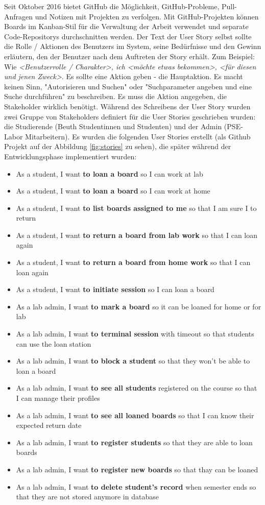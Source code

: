 Seit Oktober 2016 bietet GitHub die Möglichkeit, GitHub-Probleme, Pull-Anfragen und Notizen mit Projekten zu verfolgen. Mit GitHub-Projekten können Boards im Kanban-Stil für die Verwaltung der Arbeit verwendet und separate Code-Repositorys durchschnitten werden. Der Text der User Story selbst sollte die Rolle / Aktionen des Benutzers im System, seine Bedürfnisse und den Gewinn erläutern, den der Benutzer nach dem Auftreten der Story erhält. Zum Beispiel: Wie \textit{<Benutzerrolle / Charakter>, ich <möchte etwas bekommen>, <für diesen und jenen Zweck>}. Es sollte eine Aktion geben - die Hauptaktion. Es macht keinen Sinn, "Autorisieren und Suchen" oder "Suchparameter angeben und eine Suche durchführen" zu beschreiben. Es muss die Aktion angegeben, die Stakeholder wirklich benötigt. Während des Schreibens der User Story wurden zwei Gruppe von Stakeholders definiert für die User Stories geschrieben wurden: die Studierende (Beuth Studentinnen und Studenten) und der Admin (PSE-Labor Mitarbeitern). Es wurden die folgenden User Stories erstellt (als Github Projekt auf der Abbildung \ref*{fig:stories} zu sehen), die später während der Entwicklungsphase implementiert wurden:
\begin{itemize}
	\itemsep-1.2em 
	\item As a student, I want \textbf{to loan a board} so I can work at lab
	\item As a student, I want \textbf{to loan a board} so I can work at home
	\item As a student, I want \textbf{to list boards assigned to me} so that I am sure I to return
	\item As a student, I want \textbf{to return a board from lab work} so that I can loan again
	\item As a student, I want \textbf{to return a board from home work} so that I can loan again
	\item As a student, I want \textbf{to initiate session} so I can loan a board
	\item As a lab admin, I want \textbf{to mark a board} so it can be loaned for home or for lab
	\item As a lab admin, I want \textbf{to terminal session} with timeout so that students can use the loan station
	\item As a lab admin, I want \textbf{to block a student} so that they won't be able to loan a board
	\item As a lab admin, I want \textbf{to see all students} registered on the course so that I can manage their profiles
	\item As a lab admin, I want \textbf{to see all loaned boards} so that I can know their expected return date
	\item As a lab admin, I want \textbf{to register students} so that they are able to loan boards
	\item As a lab admin, I want \textbf{to register new boards} so that thay can be loaned
	\item As a lab admin, I want \textbf{to delete student's record} when semester ends so that they are not stored anymore in database
\end{itemize}

